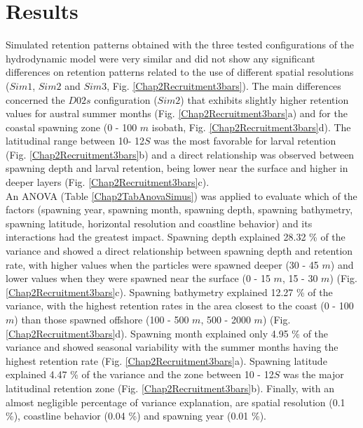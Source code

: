 \clearpage
\section{Results}\label{Chap2Resu}

Simulated retention patterns obtained with the three tested configurations of the hydrodynamic model were very similar and did not show any significant differences on retention patterns related to the use of different spatial resolutions ($Sim 1$, $Sim 2$ and $Sim 3$, Fig. \ref{Chap2Recruitment3bars}). The main differences concerned the $D02s$ configuration ($Sim 2$) that exhibits slightly higher retention values for austral summer months (Fig. \ref{Chap2Recruitment3bars}a) and for the coastal spawning zone (0 - 100 $m$ isobath, Fig. \ref{Chap2Recruitment3bars}d). The latitudinal range between 10\textdegree - 12\textdegree $S$ was the most favorable for larval retention (Fig. \ref{Chap2Recruitment3bars}b) and a direct relationship was observed between spawning depth and larval retention, being lower near the surface and higher in deeper layers (Fig. \ref{Chap2Recruitment3bars}c).\\

An ANOVA (Table \ref{Chap2TabAnovaSimus}) was applied to evaluate which of the factors (spawning year, spawning month, spawning depth, spawning bathymetry, spawning latitude, horizontal resolution and coastline behavior) and its interactions had the greatest impact. Spawning  depth explained 28.32 \% of the variance and showed a direct relationship between spawning depth and retention rate, with higher values when the particles were spawned deeper (30 - 45 $m$) and lower values when they were spawned near the surface (0 - 15 $m$, 15 - 30 $m$) (Fig. \ref{Chap2Recruitment3bars}c). Spawning bathymetry explained 12.27 \% of the variance, with the highest retention rates in the area closest to the coast (0 - 100 $m$) than those spawned offshore (100 - 500 $m$, 500 - 2000 $m$) (Fig. \ref{Chap2Recruitment3bars}d). Spawning month explained only 4.95 \% of the variance and showed seasonal variability with the summer months having the highest retention rate (Fig. \ref{Chap2Recruitment3bars}a). Spawning latitude explained 4.47 \% of the variance and the zone between 10 - 12\textdegree $S$ was the major latitudinal retention zone (Fig. \ref{Chap2Recruitment3bars}b). Finally, with an almost negligible percentage of variance explanation, are spatial resolution (0.1 \%), coastline behavior (0.04 \%) and spawning year (0.01 \%).\\

